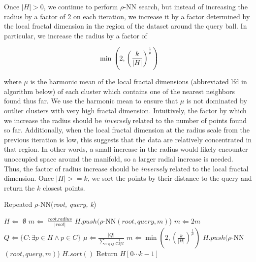 Once $|H| > 0$, we continue to perform $\rho$-NN search, but instead of increasing the radius by a factor of 2 on each iteration, we increase it by a factor determined by the local fractal dimension in the region of the dataset around the query ball. 
In particular, we increase the radius by a factor of

\begin{equation}
    \min \left(2, \left({\frac{k}{|H|}}\right)^{\frac{1}{\mu}}\right)
    \label{eq:repeated-rnn-factor}
\end{equation}

where $\mu$ is the harmonic mean of the local fractal dimensions (abbreviated lfd in algorithm below) of each cluster which contains one of the nearest neighbors found thus far.
We use the harmonic mean to ensure that $\mu$ is not dominated by outlier clusters with very high fractal dimension. 
Intuitively, the factor by which we increase the radius should be \emph{inversely} related to the number of points found so far. 
Additionally, when the local fractal dimension at the radius scale from the previous iteration is low, this suggests that the data are relatively concentrated in that region.
In other words, a small increase in the radius would likely encounter unoccupied space around the manifold, so a larger radial increase is needed.
Thus, the factor of radius increase should be \emph{inversely} related to the local fractal dimension.
Once $|H| >= k$, we sort the points by their distance to the query and return the $k$ closest points.

\begin{algorithm} %
    \caption{Repeated $\rho$-NN(\emph{root, query, k})} %
    \label{alg:knn-by-rnn} %
    \begin{algorithmic} %
        \STATE $H \Leftarrow$ $\emptyset$
        \STATE $m \Leftarrow$ $\frac{root.radius}{|root|}$
            \STATE $H.push(\rho$-NN$(root, query, m)$)
            \STATE $m \Leftarrow 2m$
        \ENDWHILE
            \STATE $Q \Leftarrow \{ C: \exists p \in H \land p \in C \}$
            \STATE $\mu \Leftarrow \frac{|Q|}{\sum_{C \in Q} \frac{1}{C.lfd}} $
            \STATE $m \Leftarrow \min \left(2, \left({\frac{k}{|H|}}\right)^{\frac{1}{\mu}}\right)$
            \STATE $H.push(\rho$-NN$(root, query, m)$)
        \ENDWHILE
        \STATE $H.sort()$
        \STATE Return $H[0 \cdots k-1]$
    \end{algorithmic}
    \end{algorithm}


